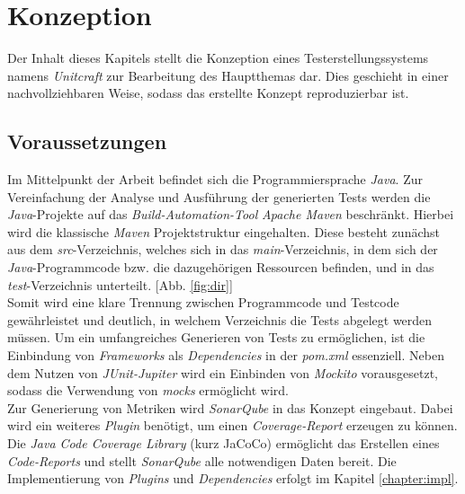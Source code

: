 \chapter{Konzeption}\label{chapter:concept}
Der Inhalt dieses Kapitels stellt die Konzeption eines Testerstellungssystems namens \textit{Unitcraft} zur Bearbeitung des Hauptthemas dar. Dies geschieht in einer nachvollziehbaren Weise, sodass das erstellte Konzept reproduzierbar ist.

\section{Voraussetzungen}
Im Mittelpunkt der Arbeit befindet sich die Programmiersprache \textit{Java}. Zur Vereinfachung der Analyse und Ausführung der generierten Tests werden die \textit{Java}-Projekte auf das \textit{Build-Automation-Tool} \textit{Apache Maven} beschränkt. Hierbei wird die klassische \textit{Maven} Projektstruktur eingehalten. Diese besteht zunächst aus dem \textit{src}-Verzeichnis, welches sich in das \textit{main}-Verzeichnis, in dem sich der \textit{Java}-Programmcode bzw. die dazugehörigen Ressourcen befinden, und in das \textit{test}-Verzeichnis unterteilt. \cite{MavenIntroductionStandard} [Abb. \ref{fig:dir}]\\ Somit wird eine klare Trennung zwischen Programmcode und Testcode gewährleistet und deutlich, in welchem Verzeichnis die Tests abgelegt werden müssen.  \newpage
Um ein umfangreiches Generieren von Tests zu ermöglichen, ist die Einbindung von \textit{Frameworks} als \textit{Dependencies} in der \textit{pom.xml} essenziell. Neben dem Nutzen von \textit{JUnit-Jupiter} wird ein Einbinden von \textit{Mockito} vorausgesetzt, sodass die Verwendung von \textit{mocks} ermöglicht wird.\\
Zur Generierung von Metriken wird \textit{SonarQube} in das Konzept eingebaut. Dabei wird ein weiteres \textit{Plugin} benötigt, um einen \textit{Coverage-Report} erzeugen zu können. Die \textit{Java Code Coverage Library} (kurz JaCoCo) ermöglicht das Erstellen eines \textit{Code-Reports} und stellt \textit{SonarQube} alle notwendigen Daten bereit.
Die Implementierung von \textit{Plugins} und \textit{Dependencies} erfolgt im Kapitel \ref{chapter:impl}.

